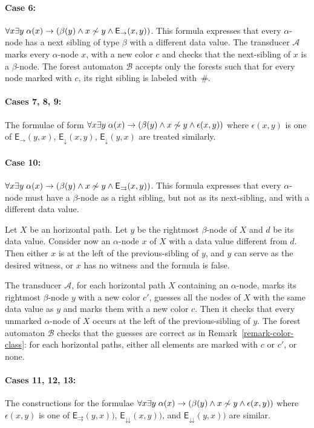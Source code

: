 \documentclass{CSML}
\newcommand\dataeq{\ensuremath{\sim}}
\newcommand\Aa{\mathcal{A}}
\newcommand\Ba{\mathcal{B}}
\newcommand\EE{\mathsf{E}}
\newcommand\NS{\EE_{\rightarrow}}
\newcommand\PC{\EE_{\downarrow}}
\newcommand\SAD{\EE_{\downdownarrows}}
\newcommand\SFS{\EE_{\rightrightarrows}}
\begin{document}
\paragraph{\bf Case 6:}
$\forall x \exists y\; \alpha(x) \to (\beta(y) \wedge x \not\dataeq y \wedge \NS(x, y))$.
This formula expresses that every $\alpha$-node has a next sibling of type $\beta$
with a different data value.
The transducer $\Aa$ marks every $\alpha$-node $x$,
with a new color $c$ and checks that the next-sibling of $x$ is a $\beta$-node.
The forest automaton $\Ba$ accepts only the forests such that
for every node marked with $c$, its right sibling is labeled with~$\#$.

\paragraph{\bf Cases 7, 8, 9:}
The formulae of form 
$\forall x \exists y\; \alpha(x) \to (\beta(y) \wedge x \not\dataeq y 
 \wedge \epsilon(x, y))$
where $\epsilon(x, y)$ is one of $\NS(y, x)$, $\PC(x, y)$, $\PC(y, x)$ 
are treated similarly.

\paragraph{\bf Case 10:}
$\forall x \exists y\; \alpha(x) \to (\beta(y) \wedge x \not\dataeq y \wedge \SFS(x, y))$.
This formula expresses that every $\alpha$-node 
must have a $\beta$-node as a right sibling, but not as its next-sibling,
and with a different data value.

Let $X$ be an horizontal path. Let $y$ be the rightmost $\beta$-node of $X$ 
and $d$ be its data value. 
Consider now an $\alpha$-node $x$ of $X$ with a data value different from $d$. 
Then either $x$ is at the left of the previous-sibling of $y$, 
and $y$ can serve as the desired witness, 
or $x$ has no witness and the formula is false.

The transducer $\Aa$, for each horizontal path $X$ containing an
$\alpha$-node, marks its rightmost $\beta$-node $y$ with a new color $c'$,
guesses all the nodes of $X$ with the same data value as $y$ and marks them
with a new color $c$. 
Then it checks that every unmarked $\alpha$-node of $X$
occurs at the left of the previous-sibling of $y$. 
The forest automaton $\Ba$ checks that the guesses are correct 
as in Remark~\ref{remark-color-class}: 
for each horizontal paths, either all elements are marked with $c$ or $c'$, or none.

\paragraph{\bf Cases 11, 12, 13:}
The constructions for the formulae
$\forall x \exists y\; \alpha(x) \to (\beta(y) \wedge x \not\dataeq y 
 \wedge \epsilon(x, y))$
where $\epsilon(x, y)$ is one of $\SFS(y, x))$, $\SAD(x, y))$, and $\SAD(y, x))$ 
are similar.
\end{document}
